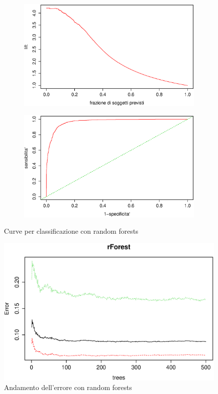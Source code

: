 \begin{figure}[H]
  \begin{subfigure}{0.4\textwidth}
    \includegraphics[width=\columnwidth]{images/class/lift-rForests.eps}
  \end{subfigure}
  \hspace*{\fill}
  \begin{subfigure}{0.4\textwidth}
    \includegraphics[width=\columnwidth]{images/class/roc-rForests.eps}
  \end{subfigure}
  \caption{Curve per classificazione con random forests}
  \label{fig:class-tree}
\end{figure}

\begin{figure}[H]
  \centering
  \includegraphics[width=.5\columnwidth]{images/class/rForests-plot.eps}
  \caption{Andamento dell'errore con random forests}
  \label{fig:final-class-tree}
\end{figure}
